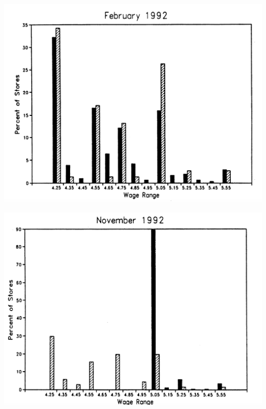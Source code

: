 \documentclass[aspectratio=169]{beamer}
\theoremstyle{principle}
\begin{document}
\begin{frame}

\begin{center}
\includegraphics[scale=0.35]{feb_1992.png}
\end{center}

\end{frame}

\begin{frame}

\begin{center}
\includegraphics[scale=0.35]{nov_1992.png}
\end{center}

\end{frame}
\end{document}
